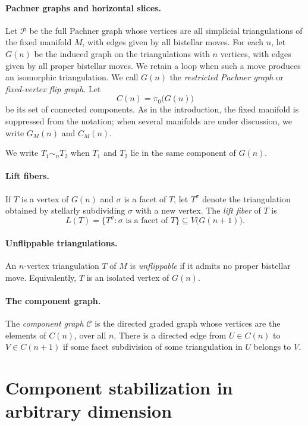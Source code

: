 \documentclass[11pt]{article}
\theoremstyle{remark}
\theoremstyle{plain}
\begin{document}
\paragraph{Pachner graphs and horizontal slices.}
Let \(\mathcal P\) be the full Pachner graph whose vertices are all
simplicial triangulations of the fixed manifold \(M\), with edges given by
all bistellar moves.  For each \(n\), let \(G(n)\) be the induced graph on
the triangulations with \(n\) vertices, with edges given by all proper
bistellar moves.  We retain a loop when such a move produces an isomorphic
triangulation.  We call \(G(n)\) the \emph{restricted Pachner graph} or
\emph{fixed-vertex flip graph}.  Let
\[
 C(n)=\pi_0\bigl(G(n)\bigr)
\]
be its set of connected components.  As in the introduction, the fixed
manifold is suppressed from the notation; when several manifolds are under
discussion, we write \(G_M(n)\) and \(C_M(n)\).

We write \(T_1\sim_n T_2\) when \(T_1\) and \(T_2\) lie in the same
component of \(G(n)\).

\paragraph{Lift fibers.}
If \(T\) is a vertex of \(G(n)\) and \(\sigma\) is a facet of \(T\), let
\(T^\sigma\) denote the triangulation obtained by stellarly subdividing
\(\sigma\) with a new vertex.  The \emph{lift fiber} of \(T\) is
\[
 L(T)=\{T^\sigma:\sigma\text{ is a facet of }T\}
 \subseteq V\bigl(G(n+1)\bigr).
\]

\paragraph{Unflippable triangulations.}
An \(n\)-vertex triangulation \(T\) of \(M\) is \emph{unflippable} if it
admits no proper bistellar move.  Equivalently, \(T\) is an isolated vertex
of \(G(n)\).

\paragraph{The component graph.}
The \emph{component graph} \(\mathcal C\) is the directed graded graph whose
vertices are the elements of \(C(n)\), over all \(n\).  There is a directed
edge from \(U\in C(n)\) to \(V\in C(n+1)\) if some facet subdivision of some
triangulation in \(U\) belongs to \(V\).

\section{Component stabilization in arbitrary dimension}
\label{sec:stabilization}
\end{document}
